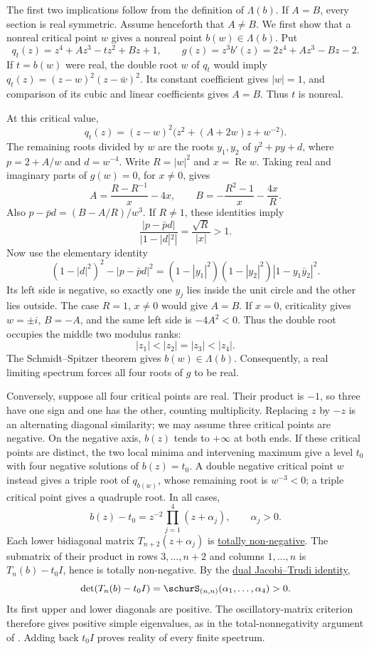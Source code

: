 \begin{proof*}
The first two implications follow from the definition of $\Lambda(b)$.
If $A=B$, every section is real symmetric. Assume henceforth that $A\ne B$.
We first show that a nonreal critical point $w$ gives a nonreal point
$b(w)\in\Lambda(b)$. Put
\[
 q_t(z)=z^4+Az^3-tz^2+Bz+1,\qquad
 g(z)=z^3b'(z)=2z^4+Az^3-Bz-2.
\]
If $t=b(w)$ were real, the double root $w$ of $q_t$ would imply
$q_t(z)=(z-w)^2(z-\bar w)^2$. Its constant coefficient gives $|w|=1$,
and comparison of its cubic and linear coefficients gives $A=B$.
Thus $t$ is nonreal.

At this critical value,
\[
 q_t(z)=(z-w)^2\bigl(z^2+(A+2w)z+w^{-2}\bigr).
\]
The remaining roots divided by $w$ are the roots $y_1,y_2$ of
$y^2+py+d$, where $p=2+A/w$ and $d=w^{-4}$.
Write $R=|w|^2$ and $x=\operatorname{Re}w$.
Taking real and imaginary parts of $g(w)=0$, for $x\ne0$, gives
\[
 A=\frac{R-R^{-1}}x-4x,\qquad
 B=-\frac{R^2-1}x-\frac{4x}R.
\]
Also $p-\bar p d=(B-A/R)/w^3$. If $R\ne1$, these identities imply
\[
 \frac{|p-\bar p d|}{|1-|d|^2|}=\frac{\sqrt R}{|x|}>1.
\]
Now use the elementary identity
\[
 (1-|d|^2)^2-|p-\bar p d|^2
 =(1-|y_1|^2)(1-|y_2|^2)|1-y_1\bar y_2|^2.
\]
Its left side is negative, so exactly one $y_j$ lies inside the unit circle
and the other lies outside. The case $R=1$, $x\ne0$ would give $A=B$.
If $x=0$, criticality gives $w=\pm i$, $B=-A$, and the same left side
is $-4A^2<0$. Thus the double root occupies the middle two modulus ranks:
\[
 |z_1|<|z_2|=|z_3|<|z_4|.
\]
The Schmidt--Spitzer theorem gives $b(w)\in\Lambda(b)$.
Consequently, a real limiting spectrum forces all four roots of $g$ to be real.

Conversely, suppose all four critical points are real. Their product is $-1$,
so three have one sign and one has the other, counting multiplicity.
Replacing $z$ by $-z$ is an alternating diagonal similarity; we may assume
three critical points are negative. On the negative axis, $b(z)$ tends to
$+\infty$ at both ends. If these critical points are distinct, the two local
minima and intervening maximum give a level $t_0$ with four negative
solutions of $b(z)=t_0$. A double negative critical point $w$ instead gives
a triple root of $q_{b(w)}$, whose remaining root is $w^{-3}<0$;
a triple critical point gives a quadruple root. In all cases,
\[
 b(z)-t_0=z^{-2}\prod_{j=1}^4(z+\alpha_j),\qquad \alpha_j>0.
\]
Each lower bidiagonal matrix $T_{n+2}(z+\alpha_j)$ is
\hyperref[totallyNonnegative]{totally non-negative}.
The submatrix of their product in rows $3,\dotsc,n+2$ and columns
$1,\dotsc,n$ is $T_n(b)-t_0I$, hence is totally non-negative.
By the \hyperref[schurJacobiTrudi]{dual Jacobi--Trudi identity},
\[
 \det(T_n(b)-t_0I)=\schurS_{(n,n)}(\alpha_1,\dotsc,\alpha_4)>0.
\]
Its first upper and lower diagonals are positive. The oscillatory-matrix
criterion therefore gives positive simple eigenvalues, as in the
total-nonnegativity argument of \cite{ShapiroStampach2023Correction}.
Adding back $t_0I$ proves reality of every finite spectrum.


\end{proof*}
